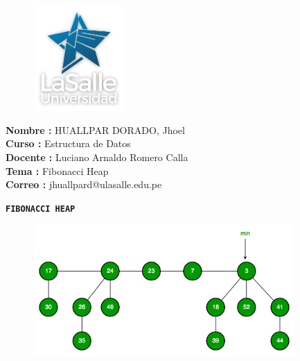 \documentclass[11pt]{beamer}
\begin{document}
\begin{frame}

\begin{figure}[center]
  \includegraphics[width=3.5cm, height=4cm]{Img/ULA.png}
\end{figure}


{\bf \large Nombre  :} \large HUALLPAR DORADO, Jhoel \\
{\bf \large Curso   :} \large Estructura de Datos \\
{\bf \large Docente :} \large Luciano Arnaldo Romero Calla \\
{\bf \large Tema    :} \Large Fibonacci Heap\\
{\bf \large Correo  :} \large jhuallpard@ulasalle.edu.pe\\

\titlepage
\end{frame}

\begin{frame} {\bf \large {}}
\tableofcontents
{\center \bf \Huge \color{purple} \texttt{FIBONACCI HEAP} \\}

\begin{figure}[center]
  \includegraphics[width=10cm, height=5cm]{Img/FH.png}
\end{figure}

\end{frame}
\end{document}
